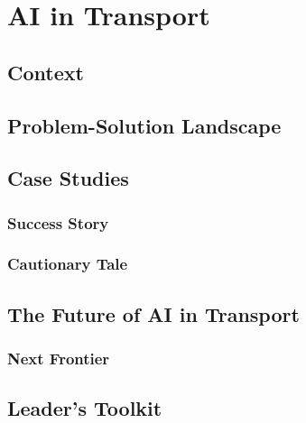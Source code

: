 \chapter{AI in Transport}
\label{chap:ai_in_transport}

\section{Context}
\label{sec:transport_context}

\section{Problem-Solution Landscape}
\label{sec:transport_problem_solution}

\section{Case Studies}
\label{sec:transport_case_studies}
\subsection{Success Story}
\label{sec:transport_success_story}
\subsection{Cautionary Tale}
\label{sec:transport_cautionary_tale}

\section{The Future of AI in Transport}
\label{sec:future_of_ai_in_transport}
\subsection{Next Frontier}
\label{sec:transport_next_frontier}

\section{Leader's Toolkit}
\label{sec:transport_leaders_toolkit}